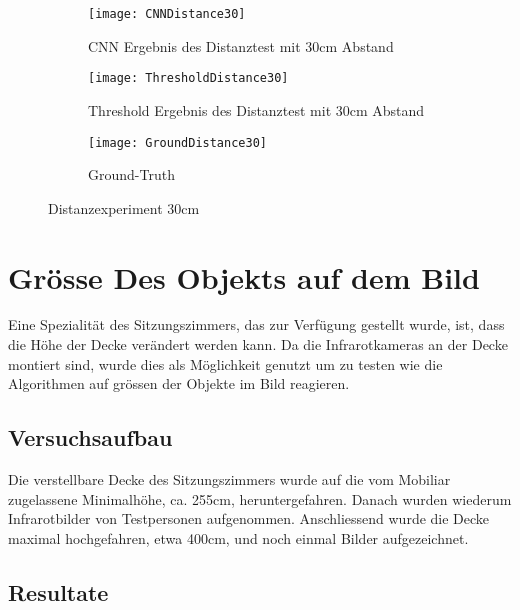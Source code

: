 \begin{figure}[H]
	\begin{subfigure}{.45\linewidth}
		\centering
		\texttt{[image: CNNDistance30]}
		\caption{\gls{CNN} Ergebnis des Distanztest mit 30cm Abstand}
		\label{fig:cnnDistance30}
	\end{subfigure}\hfill%
	\begin{subfigure}{.45\linewidth}
		\centering
		\texttt{[image: ThresholdDistance30]}
		\caption{Threshold Ergebnis des Distanztest mit 30cm Abstand}
		\label{fig:thresholdDistance30}
	\end{subfigure}
	\begin{subfigure}{\linewidth}
		\centering
		\texttt{[image: GroundDistance30]}
		\caption{Ground-Truth}
		\label{fig:groundDistance30}
	\end{subfigure}
	\caption{Distanzexperiment 30cm}
	\label{fig:Distance30}
\end{figure}

\section{Grösse Des Objekts auf dem Bild}
\label{sec:objectSize}
Eine Spezialität des Sitzungszimmers, das zur Verfügung gestellt wurde, ist, dass die Höhe der Decke verändert werden kann. Da die Infrarotkameras an der Decke montiert sind, wurde dies als Möglichkeit genutzt um zu testen wie die Algorithmen auf grössen der Objekte im Bild reagieren. 

\subsection{Versuchsaufbau}

Die verstellbare Decke des Sitzungszimmers wurde auf die vom Mobiliar zugelassene Minimalhöhe, ca. 255cm, heruntergefahren. Danach wurden wiederum Infrarotbilder von Testpersonen aufgenommen. Anschliessend wurde die Decke maximal hochgefahren, etwa 400cm, und noch einmal Bilder aufgezeichnet.

\subsection{Resultate}

